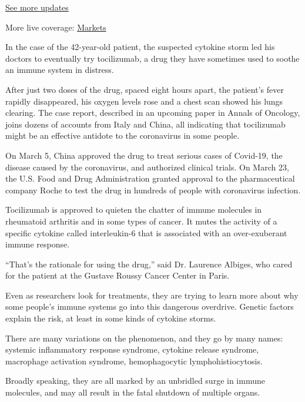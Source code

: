 \href{https://www.nytimes3xbfgragh.onion/2020/09/09/world/covid-19-coronavirus.html?action=click\&pgtype=Article\&state=default\&region=MAIN_CONTENT_1\&context=storylines_live_updates}{See
more updates}

More live coverage:
\href{https://www.nytimes3xbfgragh.onion/live/2020/09/09/business/stock-market-today-coronavirus?action=click\&pgtype=Article\&state=default\&region=MAIN_CONTENT_1\&context=storylines_live_updates}{Markets}

In the case of the 42-year-old patient, the suspected cytokine storm led
his doctors to eventually try tocilizumab, a drug they have sometimes
used to soothe an immune system in distress.

After just two doses of the drug, spaced eight hours apart, the
patient's fever rapidly disappeared, his oxygen levels rose and a chest
scan showed his lungs clearing. The case report, described in an
upcoming paper in Annals of Oncology, joins dozens of accounts from
Italy and China, all indicating that tocilizumab might be an effective
antidote to the coronavirus in some people.

On March 5, China approved the drug to treat serious cases of Covid-19,
the disease caused by the coronavirus, and authorized clinical trials.
On March 23, the U.S. Food and Drug Administration granted approval to
the pharmaceutical company Roche to test the drug in hundreds of people
with coronavirus infection.

Tocilizumab is approved to quieten the chatter of immune molecules in
rheumatoid arthritis and in some types of cancer. It mutes the activity
of a specific cytokine called interleukin-6 that is associated with an
over-exuberant immune response.

``That's the rationale for using the drug,'' said Dr. Laurence Albiges,
who cared for the patient at the Gustave Roussy Cancer Center in Paris.

Even as researchers look for treatments, they are trying to learn more
about why some people's immune systems go into this dangerous overdrive.
Genetic factors explain the risk, at least in some kinds of cytokine
storms.

There are many variations on the phenomenon, and they go by many names:
systemic inflammatory response syndrome, cytokine release syndrome,
macrophage activation syndrome, hemophagocytic lymphohistiocytosis.

Broadly speaking, they are all marked by an unbridled surge in immune
molecules, and may all result in the fatal shutdown of multiple organs.


